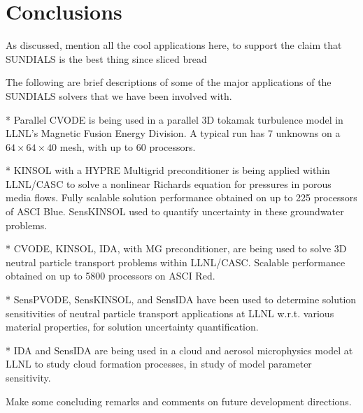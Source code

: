 \section{Conclusions}\label{s:conclusions}

{\sf As discussed, mention all the cool applications here, to support
the claim that SUNDIALS is the best thing since sliced bread}

The following are brief descriptions of some of the major applications
of the SUNDIALS solvers that we have been involved with.

* Parallel CVODE is being used in a parallel 3D tokamak turbulence model in
LLNL's Magnetic Fusion Energy Division.  A typical run has 7 unknowns
on a $64 \times 64 \times 40$ mesh, with up to 60 processors.

* KINSOL with a HYPRE Multigrid preconditioner is being applied within
LLNL/CASC to solve a nonlinear Richards equation for pressures in
porous media flows.  Fully scalable solution performance obtained on
up to 225 processors of ASCI Blue.  SensKINSOL used to quantify
uncertainty in these groundwater problems.

* CVODE, KINSOL, IDA, with MG preconditioner, are being used to
solve 3D neutral particle transport problems within LLNL/CASC.
Scalable performance obtained on up to 5800 processors on ASCI Red.

* SensPVODE, SensKINSOL, and SensIDA have been used to determine
solution sensitivities of neutral particle transport applications at
LLNL w.r.t. various material properties, for solution uncertainty
quantification.

* IDA and SensIDA are being used in a cloud and aerosol microphysics
model at LLNL to study cloud formation processes, in study of model
parameter sensitivity.


{\sf Make some concluding remarks and comments on future development 
directions.}



